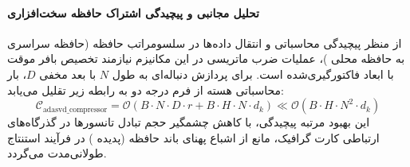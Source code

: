 \paragraph{تحلیل مجانبی و پیچیدگی اشتراک حافظه سخت‌افزاری}
از منظر پیچیدگی محاسباتی و انتقال داده‌ها در سلسومراتب حافظه (حافظه سراسری  به حافظه محلی )، عملیات ضرب ماتریسی در این مکانیزم نیازمند تخصیص بافر موقت با ابعاد فاکتورگیری‌شده است. برای پردازش دنباله‌ای به طول $N$ با بعد مخفی $D$، بار محاسباتی هسته از فرم درجه دو به رابطه زیر تقلیل می‌یابد:
\begin{equation}
\label{eq:complexity_adasvd_compressor}
\mathcal{C}_{\text{adasvd\_compressor}} = \mathcal{O}\left( B \cdot N \cdot D \cdot r + B \cdot H \cdot N \cdot d_k \right) \ll \mathcal{O}\left( B \cdot H \cdot N^2 \cdot d_k \right)
\end{equation}
این بهبود مرتبه پیچیدگی، با کاهش چشمگیر حجم تبادل تانسورها در گذرگاه‌های ارتباطی کارت گرافیک، مانع از اشباع پهنای باند حافظه (پدیده ) در فرآیند استنتاج طولانی‌مدت می‌گردد.
